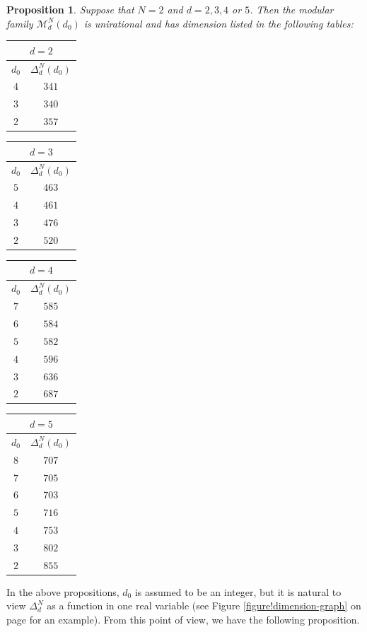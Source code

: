 \documentclass[a4paper,11pt]{amsart}
\newcommand{\M}{\ensuremath{\mathcal{M}}}
\newtheorem{prop}[thm]{Proposition}
\theoremstyle{definition}
\theoremstyle{remark}
\numberwithin{equation}{section}
\begin{document}
\begin{prop} \label{prop: dimension moduli N=2} 
	Suppose that $N = 2$ and $d = 2, 3, 4$ or $5$. Then the modular family $\M^N_d(d_0)$ is unirational and has dimension listed in the following tables:
	
	\begin{tabular}[t]{cc}
		\multicolumn{2}{c}{$d=2$} \\
		\hline
		$d_0$ & $\Delta^N_d(d_0)$ \\
		\hline
		$4$ & $341$ \\
		$3$ & $340$\\
		$2$ & $357$\\
	\end{tabular}
	\quad\quad
	\begin{tabular}[t]{cc}
		\multicolumn{2}{c}{$d=3$} \\
		\hline
		$d_0$ & $\Delta^N_d(d_0)$ \\
		\hline
		$5$ & $463$ \\
		$4$ & $461$ \\
		$3$ & $476$ \\
		$2$ & $520$ \\
	\end{tabular}
	\quad\quad
	\begin{tabular}[t]{cc}
		\multicolumn{2}{c}{$d=4$} \\
		\hline
		$d_0$ & $\Delta^N_d(d_0)$ \\
		\hline
		$7$ & $585$ \\
		$6$ & $584$ \\
		$5$ & $582$ \\
		$4$ & $596$ \\
		$3$ & $636$ \\
		$2$ & $687$
	\end{tabular}
	\quad\quad
	\begin{tabular}[t]{cc}
		\multicolumn{2}{c}{$d=5$} \\
		\hline
		$d_0$ & $\Delta^N_d(d_0)$ \\
		\hline
		$8$ & $707$ \\
		$7$ & $705$ \\
		$6$ & $703$ \\
		$5$ & $716$ \\
		$4$ & $753$ \\
		$3$ & $802$ \\
		$2$ & $855$
	\end{tabular}
\end{prop}

In the above propositions, $d_0$ is assumed to be an integer, but it is natural to view $\Delta^N_d$ as a function in one real variable (see Figure \ref{figure!dimension-graph} on page \pageref{figure!dimension-graph} for an example). From this point of view, we have the following proposition.
\end{document}
